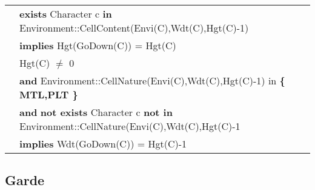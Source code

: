 \documentclass{article}
\begin{document}
\begin{tabular}{rl}
& \textbf{exists} \textrm{Character} c \textbf{in} \textrm{Environment::CellContent(Envi(C),Wdt(C),Hgt(C)-1)} \\
& \quad \textbf{implies} \textrm{Hgt(GoDown(C))} = \textrm{Hgt(C)} \\

& \textrm{Hgt(C)} $\neq$ 0 \\
& \quad \textbf{and} \textrm{Environment::CellNature(Envi(C),Wdt(C),Hgt(C)-1)} \textrm{in} \textbf{ \{ MTL,PLT \} } \\
& \quad \textbf{and} \textbf{not exists} \textrm{Character} c \textbf{ not in} \textrm{Environment::CellNature(Envi(C),Wdt(C),Hgt(C)-1} \\
& \quad \textbf{implies} \textrm{Wdt(GoDown(C))} = \textrm{Hgt(C)}-1 \\

\end{tabular}



\subsection*{Garde}
\end{document}

